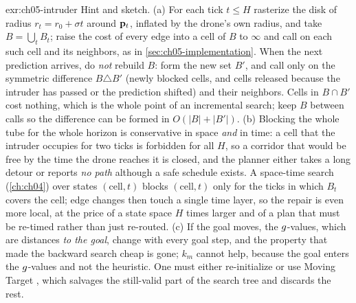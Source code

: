 \begin{solution}{exr:ch05-intruder}
Hint and sketch. (a) For each tick $t\le H$ rasterize the disk of radius $r_t=r_0+\sigma t$ around $\mathbf{p}_t$, inflated by the drone's own radius, and take $B=\bigcup_t B_t$; raise the cost of every edge into a cell of $B$ to $\infty$ and call \DslUpdateVertex on each such cell and its neighbors, as in \cref{sec:ch05-implementation}. When the next prediction arrives, do \emph{not} rebuild $B$: form the new set $B'$, and call \DslUpdateVertex only on the symmetric difference $B\triangle B'$ (newly blocked cells, and cells released because the intruder has passed or the prediction shifted) and their neighbors. Cells in $B\cap B'$ cost nothing, which is the whole point of an incremental search; keep $B$ between calls so the difference can be formed in $O(|B|+|B'|)$. (b) Blocking the whole tube for the whole horizon is conservative in space \emph{and} in time: a cell that the intruder occupies for two ticks is forbidden for all $H$, so a corridor that would be free by the time the drone reaches it is closed, and the planner either takes a long detour or reports \emph{no path} although a safe schedule exists. A space-time search (\cref{ch:ch04}) over states $(\text{cell},t)$ blocks $(\text{cell},t)$ only for the ticks in which $B_t$ covers the cell; edge changes then touch a single time layer, so the repair is even more local, at the price of a state space $H$ times larger and of a plan that must be re-timed rather than just re-routed. (c) If the goal moves, the $g$-values, which are distances \emph{to the goal}, change with every goal step, and the property that made the backward search cheap is gone; $k_m$ cannot help, because the goal enters the $g$-values and not the heuristic. One must either re-initialize or use Moving Target \dstarlite \cite{sun2010moving}, which salvages the still-valid part of the search tree and discards the rest.
\end{solution}
